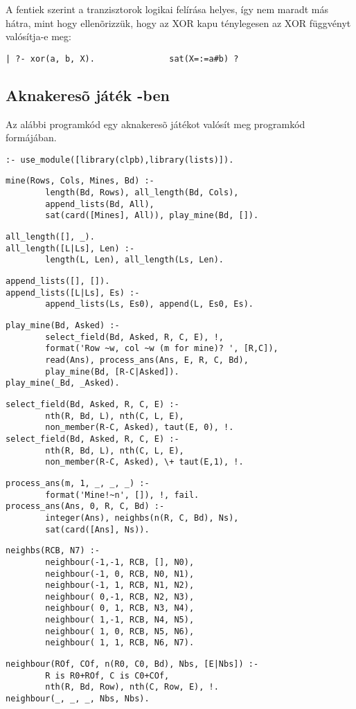 A fentiek szerint a tranzisztorok logikai felírása helyes, így nem
maradt más hátra, mint hogy ellenõrizzük, hogy az XOR kapu ténylegesen
az XOR függvényt valósítja-e meg:

\begin{verbatim}
| ?- xor(a, b, X).               sat(X=:=a#b) ?
\end{verbatim}

\subsection{Aknakeresõ játék \Clpb -ben}

Az alábbi programkód egy aknakeresõ játékot valósít meg \clpb programkód
formájában.

\begin{verbatim}
:- use_module([library(clpb),library(lists)]).
\end{verbatim}
\begin{verbatim}
mine(Rows, Cols, Mines, Bd) :-
        length(Bd, Rows), all_length(Bd, Cols), 
        append_lists(Bd, All),
        sat(card([Mines], All)), play_mine(Bd, []).
\end{verbatim}
\begin{verbatim}
all_length([], _).
all_length([L|Ls], Len) :- 
        length(L, Len), all_length(Ls, Len).
\end{verbatim}
\begin{verbatim}
append_lists([], []).
append_lists([L|Ls], Es) :-
        append_lists(Ls, Es0), append(L, Es0, Es).
\end{verbatim}
\begin{verbatim}
play_mine(Bd, Asked) :- 
        select_field(Bd, Asked, R, C, E), !,
        format('Row ~w, col ~w (m for mine)? ', [R,C]), 
        read(Ans), process_ans(Ans, E, R, C, Bd), 
        play_mine(Bd, [R-C|Asked]).
play_mine(_Bd, _Asked).
\end{verbatim}
\begin{verbatim}
select_field(Bd, Asked, R, C, E) :-
        nth(R, Bd, L), nth(C, L, E), 
        non_member(R-C, Asked), taut(E, 0), !.
select_field(Bd, Asked, R, C, E) :-
        nth(R, Bd, L), nth(C, L, E), 
        non_member(R-C, Asked), \+ taut(E,1), !.
\end{verbatim}
\begin{verbatim}
process_ans(m, 1, _, _, _) :- 
        format('Mine!~n', []), !, fail.
process_ans(Ans, 0, R, C, Bd) :-
        integer(Ans), neighbs(n(R, C, Bd), Ns), 
        sat(card([Ans], Ns)).
\end{verbatim}
\begin{verbatim}
neighbs(RCB, N7) :-
        neighbour(-1,-1, RCB, [], N0), 
        neighbour(-1, 0, RCB, N0, N1),
        neighbour(-1, 1, RCB, N1, N2), 
        neighbour( 0,-1, RCB, N2, N3),
        neighbour( 0, 1, RCB, N3, N4), 
        neighbour( 1,-1, RCB, N4, N5),
        neighbour( 1, 0, RCB, N5, N6), 
        neighbour( 1, 1, RCB, N6, N7).
\end{verbatim}
\begin{verbatim}
neighbour(ROf, COf, n(R0, C0, Bd), Nbs, [E|Nbs]) :-
        R is R0+ROf, C is C0+COf, 
        nth(R, Bd, Row), nth(C, Row, E), !.
neighbour(_, _, _, Nbs, Nbs).
\end{verbatim}

